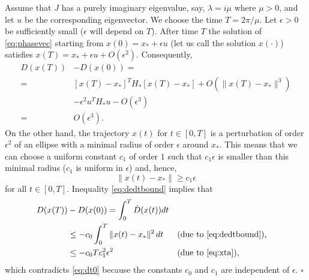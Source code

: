 \documentclass[aps,pre,twocolumn,a4paper,showkeys,showpacs]{revtex4}\usepackage{color}
\theoremstyle{plain}
\theoremstyle{plain}
\begin{document}
Assume that $J$ has a purely imaginary eigenvalue, say, $\lambda=i\mu$ where
$\mu>0$, and let $u$ be the corresponding eigenvector. We choose the time
$T=2\pi/\mu$. Let $\epsilon>0$ be sufficiently small ($\epsilon$ will depend
on $T$). After time $T$ the solution of \eqref{eq:phasevec} starting from
$x(0)=x_{*}+\epsilon u$ (let us call the solution $x(\cdot)$) satisfies
$x(T)=x_{*}+\epsilon u+O(\epsilon^{2})$. Consequently,
\begin{align}
D(x(T)) & -D(x(0))=\nonumber\\
=\  &  [x(T)-x_{*}]^{T}H_{*}[x(T)-x_{*}]+O(\|x(T)-x_{*}\|^{3})\nonumber\\
&  -\epsilon^{2}u^{T}H_{*}u-O(\epsilon^{3})\nonumber\\
=\  &  O(\epsilon^{3})\mbox{.}\label{eq:dt0}\end{align}
On the other hand, the trajectory $x(t)$ for $t\in[0,T]$ is a perturbation of
order $\epsilon^{2}$ of an ellipse with a minimal radius of order $\epsilon$
around $x_{*}$. This means that we can choose a uniform constant $c_{1}$ of
order $1$ such that $c_{1}\epsilon$ is smaller than this minimal radius
($c_{1}$ is uniform in $\epsilon$) and, hence,
\begin{equation}
\|x(t)-x_{*}\|\geq c_{1}\epsilon\label{eq:xta}\end{equation}
for all $t\in[0,T]$. Inequality \eqref{eq:dedtbound} implies that
\begin{align*}
D(x(T)) & -D(x(0)) =\int_{0}^{T}\dot{D}(x(t))dt & \\
&  \leq-c_{0}\int_{0}^{T}\|x(t)-x_{*}\|^{2}\, dt &  &
\mbox{(due to \eqref{eq:dedtbound}),}\\
&  \leq-c_{0}Tc_{1}^{2}\epsilon^{2} &  &  \mbox{(due to \eqref{eq:xta}),}
\end{align*}
which contradicts \eqref{eq:dt0} because the constants $c_{0}$ and $c_{1}$ are
independent of $\epsilon$. \hfill$\square$
\end{document}
